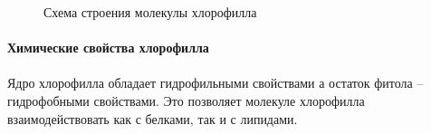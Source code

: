 \begin{figure}[h]
\begin{minipage}[h]{0.49\linewidth}
\end{minipage}
\caption{Схема строения молекулы хлорофилла}

\label{hlorophilus_molecula}
\end{figure}



\paragraph*{Химические свойства хлорофилла}

\paragraph*{}Ядро хлорофилла обладает гидрофильными свойствами а остаток фитола -- гидрофобными свойствами. Это позволяет молекуле хлорофилла взаимодействовать как с белками, так и с липидами. 

